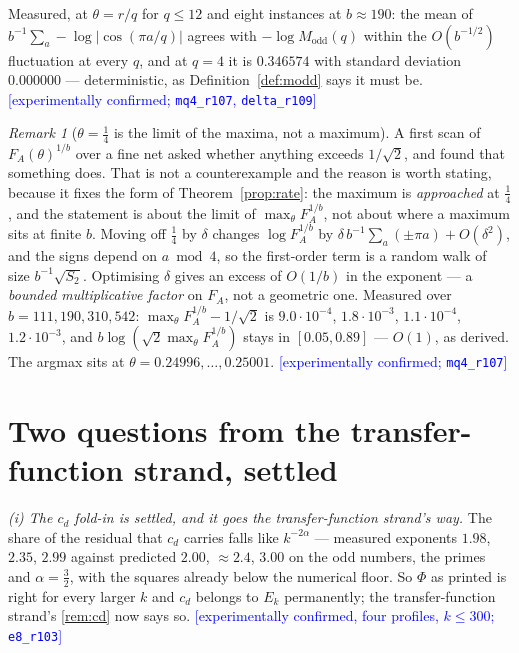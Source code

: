 \documentclass[11pt,a4paper]{article}
\theoremstyle{plain}
\theoremstyle{definition}
\theoremstyle{remark}
\newtheorem{remark}[theorem]{Remark}
\newcommand{\STATUS}[1]{\textcolor{blue}{\textsf{[#1]}}}
\begin{document}
Measured, at $\theta=r/q$ for $q\le12$ and eight instances at $b\approx190$: the mean of
$b^{-1}\sum_a-\log|\cos(\pi a/q)|$ agrees with $-\log M_{\mathrm{odd}}(q)$ within the
$O(b^{-1/2})$ fluctuation at every $q$, and at $q=4$ it is $0.346574$ with standard deviation
$0.000000$ --- deterministic, as Definition~\ref{def:modd} says it must be.
\STATUS{experimentally confirmed; \texttt{mq4\_r107}, \texttt{delta\_r109}}

\begin{remark}[$\theta=\tfrac14$ is the limit of the maxima, not a maximum]\label{rem:notmax}
A first scan of $F_A(\theta)^{1/b}$ over a fine net asked whether anything exceeds $1/\sqrt2$,
and found that something does. That is not a counterexample and the reason is worth stating,
because it fixes the form of Theorem~\ref{prop:rate}: the maximum is \emph{approached} at
$\tfrac14$, and the statement is about the limit of $\max_\theta F_A^{1/b}$, not about where a
maximum sits at finite $b$. Moving off $\tfrac14$ by $\delta$
changes $\log F_A^{1/b}$ by $\delta\,b^{-1}\sum_a(\pm\pi a)+O(\delta^{2})$, and the signs
depend on $a\bmod 4$, so the first-order term is a random walk of size $b^{-1}\sqrt{S_2}$.
Optimising $\delta$ gives an excess of $O(1/b)$ in the exponent --- a \emph{bounded
multiplicative factor} on $F_A$, not a geometric one. Measured over
$b=111,190,310,542$: $\max_\theta F_A^{1/b}-1/\sqrt2$ is
$9.0\cdot10^{-4}$, $1.8\cdot10^{-3}$, $1.1\cdot10^{-4}$, $1.2\cdot10^{-3}$, and
$b\log(\sqrt2\max_\theta F_A^{1/b})$ stays in $[0.05,0.89]$ --- $O(1)$, as derived. The
argmax sits at $\theta=0.24996,\dots,0.25001$.
\STATUS{experimentally confirmed; \texttt{mq4\_r107}}
\end{remark}

\section{Two questions from the transfer-function strand, settled}\label{sec:inherited}
\emph{(i) The $c_d$ fold-in is settled, and it goes the transfer-function strand's way.} The share of the
residual that $c_d$ carries falls like $k^{-2\alpha}$ --- measured exponents $1.98$, $2.35$,
$2.99$ against predicted $2.00$, ${\approx}2.4$, $3.00$ on the odd numbers, the primes and
$\alpha=\tfrac32$, with the squares already below the numerical floor. So $\Phi$ as printed
is right for every larger $k$ and $c_d$ belongs to $E_k$ permanently; the transfer-function strand's
\ref{rem:cd} now says so. \STATUS{experimentally confirmed, four profiles, $k\le300$;
\texttt{e8\_r103}}
\end{document}
